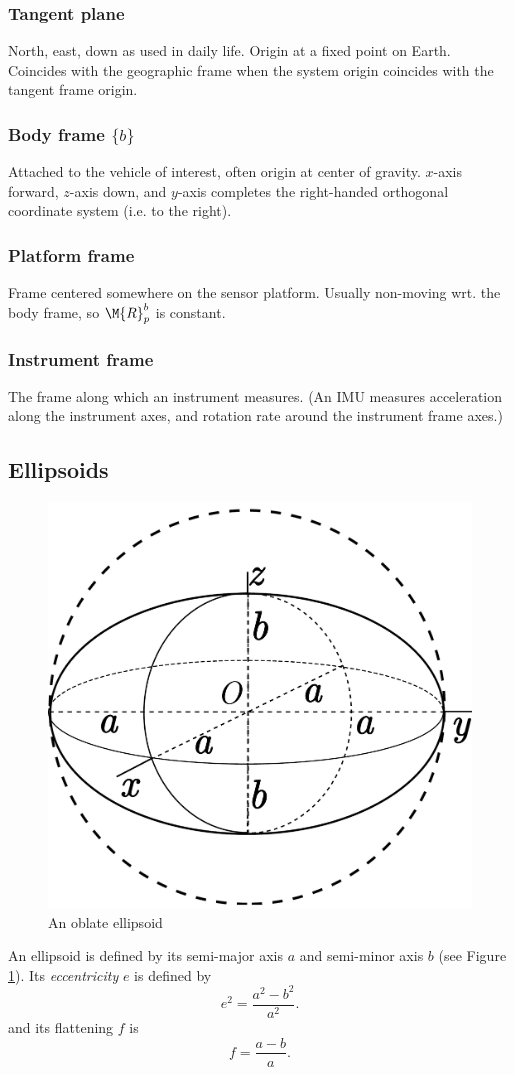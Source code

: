 \subsubsection{Tangent plane}
North, east, down as used in daily life. Origin at a fixed point on Earth. Coincides with the geographic frame when the system origin coincides with the tangent frame origin.

\subsubsection{Body frame $\{b\}$}
Attached to the vehicle of interest, often origin at center of gravity. $x$-axis forward, $z$-axis down, and $y$-axis completes the right-handed orthogonal coordinate system (i.e. to the right).

\subsubsection{Platform frame}
Frame centered somewhere on the sensor platform. Usually non-moving wrt. the body frame, so $\M{R}_p^b$ is constant.

\subsubsection{Instrument frame}
The frame along which an instrument measures. (An IMU measures acceleration along the instrument axes, and rotation rate around the instrument frame axes.)

\subsection{Ellipsoids}

\begin{figure}[htbp]
    \centering
    \includegraphics[width=.6\linewidth]{img/ellipsoid}
    \caption{An oblate ellipsoid}
    \label{fig:ellipsoid}
\end{figure}
An ellipsoid is defined by its semi-major axis $a$ and semi-minor axis $b$ (see Figure \ref{fig:ellipsoid}). Its \emph{eccentricity} $e$ is defined by
\begin{equation}
    e^2 = \frac{a^2 - b^2}{a^2} .
\end{equation}
and its flattening $f$ is
\begin{equation}
    f = \frac{a-b}{a} .
\end{equation}

